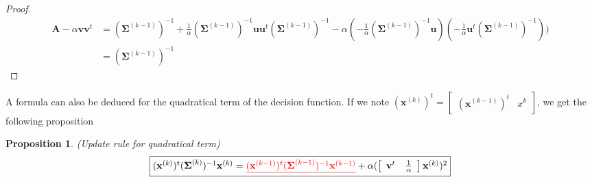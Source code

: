 \documentclass[a4paper,11pt,DIV=16]{scrartcl}
\newcommand*{\equl}[2]{%
    \textcolor{#1}{\underline{#2}}%
}
\newtheorem{prop}{Proposition}
\begin{document}
        \begin{proof}
            \begin{align*}
                \mathbf{A} - \alpha \mathbf{v} \mathbf{v}^t
                &= (\boldsymbol{\Sigma}^{(k-1)})^{-1} + \frac{1}{\alpha} (\boldsymbol{\Sigma}^{(k-1)})^{-1} \mathbf{u} \mathbf{u}^t (\boldsymbol{\Sigma}^{(k-1)})^{-1} - \alpha (- \frac{1}{\alpha} (\boldsymbol{\Sigma}^{(k-1)})^{-1} \mathbf{u}) (- \frac{1}{\alpha} \mathbf{u}^t (\boldsymbol{\Sigma}^{(k-1)})^{-1})) \\
                &= (\boldsymbol{\Sigma}^{(k-1)})^{-1}
            \end{align*}
        \end{proof}

        A formula can also be deduced for the quadratical term of the decision function. If we note $(\mathbf{x}^{(k)})^t = \left[\begin{array}{cc} (\mathbf{x}^{(k-1)})^t   & x^k \end{array}\right]$, we get the following proposition
        \begin{prop}
        \label{eq:update-quad}
            (Update rule for quadratical term)
            \begin{equation*}
                \fbox{$(\mathbf{x}^{(k)})^t (\boldsymbol{\Sigma}^{(k)})^{-1} \mathbf{x}^{(k)} = \equl{red}{(\mathbf{x}^{(k-1)})^t (\boldsymbol{\Sigma}^{(k-1)})^{-1} \mathbf{x}^{(k-1)}} + \alpha ( \left[\begin{array}{cc} \mathbf{v}^t & \frac{1}{\alpha} \end{array}\right] \mathbf{x}^{(k)} )^2$}
            \end{equation*}
        \end{prop}
\end{document}

